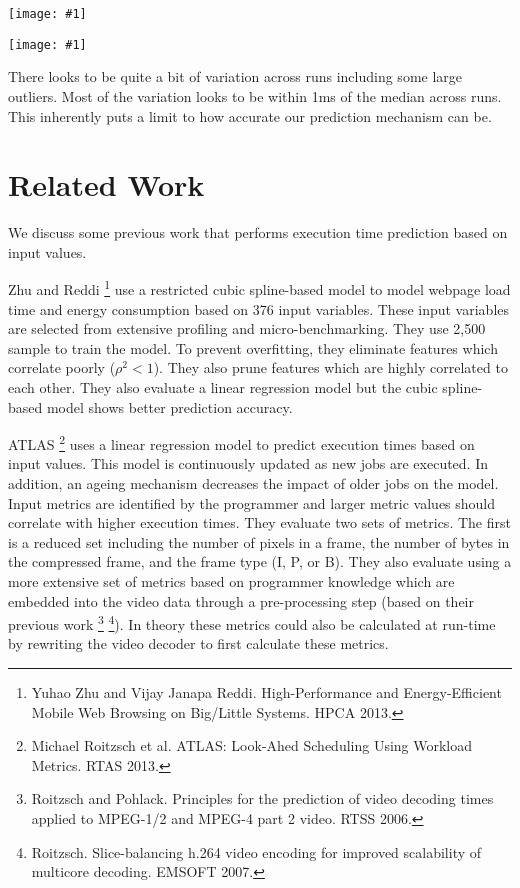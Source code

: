 \documentclass[11pt, letterpaper]{article}
\providecommand{\figcol}[1]{
    \noindent
    \begin{center}
      \texttt{[image: \#1]}
    \end{center}
  }
\begin{document}
\figcol{figs/frames_diff.png}

\figcol{figs/frames_diff_reduced.png}

There looks to be quite a bit of variation across runs including some large
outliers. Most of the variation looks to be within 1ms of the median across
runs. This inherently puts a limit to how accurate our prediction mechanism can
be.

\section{Related Work}

We discuss some previous work that performs execution time prediction based on
input values.

Zhu and Reddi \footnote{Yuhao Zhu and Vijay Janapa Reddi. High-Performance and
Energy-Efficient Mobile Web Browsing on Big/Little Systems. HPCA 2013.} use a
restricted cubic spline-based model to model webpage load time and
energy consumption based on 376 input variables. These input variables are
selected from extensive profiling and micro-benchmarking. They use 2,500 sample
to train the model. To prevent overfitting, they eliminate features which
correlate poorly ($\rho^2 < 1$).  They also prune features which are highly
correlated to each other. They also evaluate a linear regression model but the
cubic spline-based model shows better prediction accuracy.

ATLAS \footnote{Michael Roitzsch et al. ATLAS: Look-Ahed Scheduling Using
Workload Metrics. RTAS 2013.} uses a linear regression model to predict
execution times based on input
values. This model is continuously updated as new jobs are executed. In
addition, an ageing mechanism decreases the impact of older jobs on the model.
Input metrics are identified by the programmer and larger metric values should
correlate with higher execution times. They evaluate two sets of metrics. The
first is a reduced set including the number of pixels in a frame, the number of
bytes in the compressed frame, and the frame type  (I, P, or B). They also
evaluate using a more extensive set of metrics based on programmer knowledge
which are embedded into the video data through a pre-processing step (based on
their previous work \footnote{Roitzsch and Pohlack. Principles for the
prediction of video decoding times applied to MPEG-1/2 and MPEG-4 part 2 video.
RTSS 2006.} \footnote{Roitzsch. Slice-balancing h.264 video encoding for
improved scalability of multicore decoding. EMSOFT 2007.}). In theory these
metrics could also be calculated at run-time by rewriting the video decoder to
first calculate these metrics.
\end{document}
